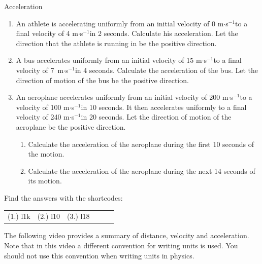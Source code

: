 \label{m38794*secfhsst!!!underscore!!!id1815}
\begin{exercises}{Acceleration }
            \nopagebreak \noindent
      \label{m38794*id62523}\begin{enumerate}[noitemsep, label=\textbf{\arabic*}. ] 
            \label{m38794*uid78}\item An athlete is accelerating uniformly from an initial velocity of 0 m$\ensuremath{\cdot}$s${}^{-1}$to a final velocity of 4 m$\ensuremath{\cdot}$s${}^{-1}$in 2 seconds. Calculate his acceleration. Let the direction that the athlete is running in be the positive direction.
\label{m38794*uid79}\item A bus accelerates uniformly from an initial velocity of 15 m$\ensuremath{\cdot}$s${}^{-1}$to a final velocity of 7~m$\ensuremath{\cdot}$s${}^{-1}$in 4 seconds. Calculate the acceleration of the bus. Let the direction of motion of the bus be the positive direction.
\label{m38794*uid80}\item An aeroplane accelerates uniformly from an initial velocity of 200 m$\ensuremath{\cdot}$s${}^{-1}$to a velocity of 100 m$\ensuremath{\cdot}$s${}^{-1}$in 10 seconds. It then accelerates uniformly to a final velocity of 240 m$\ensuremath{\cdot}$s${}^{-1}$in 20 seconds. Let the direction of motion of the aeroplane be the positive direction.
\label{m38794*id68889}\begin{enumerate}[noitemsep, label=\textbf{\alph*}. ] 
            \label{m38794*uid81}\item Calculate the acceleration of the aeroplane during the first 10 seconds of the motion.
\label{m38794*uid82}\item Calculate the acceleration of the aeroplane during the next 14 seconds of its motion.
\end{enumerate}
                \end{enumerate}
  \label{m38794**end}
\par {} Find the answers with the shortcodes:
 \par \begin{tabular}[h]{cccccc}
 (1.) l1k  &  (2.) l10  &  (3.) l18  & \end{tabular}
\end{exercises}
\label{m38794*eip-307}The following video provides a summary of distance, velocity and acceleration. Note that in this video a different convention for writing units is used. You should not use this convention when writing units in physics.
